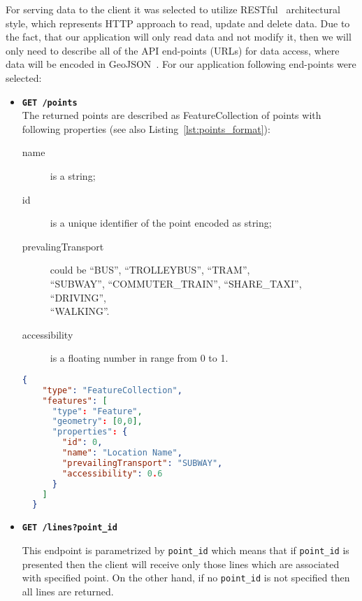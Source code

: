 For serving data to the client it was selected to utilize RESTful~\cite{rest:wiki} architectural
style, which represents HTTP approach to read, update and delete data. Due to the fact, that our
application will only read data and not modify it, then we will only need to describe all of
the API end-points (URLs) for data access, where data will be encoded in
GeoJSON~\cite{geojson:spec}. For our application following end-points were selected:

\begin{itemize}
  \item \textbf{\texttt{GET /points}} \\
  The returned points are described as FeatureCollection of points with following
  properties (see also Listing~\ref{lst:points_format}):

  \begin{description}
    \item[name] is a string;
    \item[id] is a unique identifier of the point encoded as string;
    \item[prevalingTransport] could be \mbox{``BUS''}, \mbox{``TROLLEYBUS''},
    \mbox{``TRAM''}, \\ \mbox{``SUBWAY''}, \mbox{``COMMUTER\_TRAIN''}, \mbox{``SHARE\_TAXI''},
    \mbox{``DRIVING''}, \\ \mbox{``WALKING''}.
    \item[accessibility] is a floating number in range from 0 to 1.
  \end{description}

  \begin{lstlisting}[language=json, caption=Points response example, label=lst:points_format]
  {
    "type": "FeatureCollection",
    "features": [
      "type": "Feature",
      "geometry": [0,0],
      "properties": {
        "id": 0,
        "name": "Location Name",
        "prevailingTransport": "SUBWAY",
        "accessibility": 0.6
      }
    ]
  }
  \end{lstlisting}

  \item \textbf{\texttt{GET /lines?point\_id}}

  This endpoint is parametrized by \texttt{point\_id} which means that if \texttt{point\_id} is
  presented then the client will receive only those lines which are associated with specified point.
  On the other hand, if no \texttt{point\_id} is not specified then all lines are returned.


\end{itemize}
